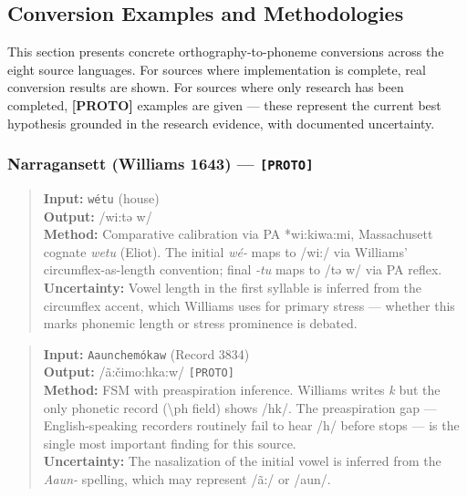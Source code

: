 
\subsection{Conversion Examples and Methodologies}
\label{sec:examples}

This section presents concrete orthography-to-phoneme conversions across the
eight source languages. For sources where implementation is complete, real
conversion results are shown. For sources where only research has been
completed, \textbf{[PROTO]} examples are given --- these represent the current
best hypothesis grounded in the research evidence, with documented uncertainty.

\subsubsection*{Narragansett (Williams 1643) --- \texttt{[PROTO]}}

\begin{quote}
\textbf{Input:} \texttt{w\'etu} (house) \\
\textbf{Output:} /wi:tə w/ \\
\textbf{Method:} Comparative calibration via PA *wi:kiwa:mi, Massachusett
cognate \textit{wetu} (Eliot). The initial \textit{w\'e-} maps to /wi:/ via
Williams' circumflex-as-length convention; final \textit{-tu} maps to /tə w/
via PA reflex. \\
\textbf{Uncertainty:} Vowel length in the first syllable is inferred from the
circumflex accent, which Williams uses for primary stress --- whether this
marks phonemic length or stress prominence is debated.
\end{quote}

\begin{quote}
\textbf{Input:} \texttt{Aaunchem\'okaw} (Record 3834) \\
\textbf{Output:} /ã:čimo:hka:w/ \texttt{[PROTO]} \\
\textbf{Method:} FSM with preaspiration inference. Williams writes \textit{k}
but the only phonetic record (\textbackslash ph field) shows /hk/. The
preaspiration gap --- English-speaking recorders routinely fail to hear /h/
before stops --- is the single most important finding for this source. \\
\textbf{Uncertainty:} The nasalization of the initial vowel is inferred from
the \textit{Aaun-} spelling, which may represent /ã:/ or /aun/.
\end{quote}

